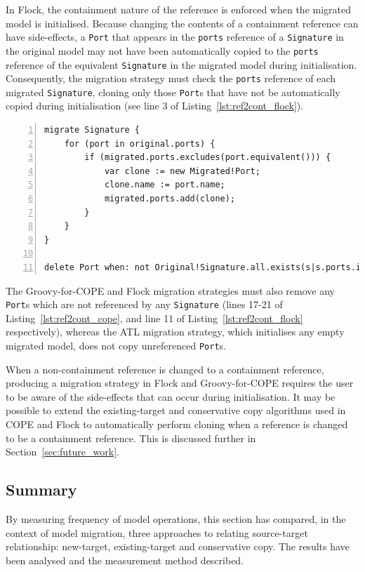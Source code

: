 In Flock, the containment nature of the reference is enforced when the migrated model is initialised. Because changing the contents of a containment reference can have side-effects, a \texttt{Port} that appears in the \texttt{ports} reference of a \texttt{Signature} in the original model may not have been automatically copied to the \texttt{ports} reference of the equivalent \texttt{Signature} in the migrated model during initialisation. Consequently, the migration strategy must check the \texttt{ports} reference of each migrated \texttt{Signature}, cloning only those \texttt{Port}s that have not be automatically copied during initialisation (see line 3 of Listing~\ref{lst:ref2cont_flock}).

\begin{lstlisting}[basicstyle=\ttfamily\footnotesize, flexiblecolumns=true, numbers=left, nolol=true, caption=Change R to C model migration in Flock, label=lst:ref2cont_flock, language=Flock, tabsize=2]
migrate Signature {
	for (port in original.ports) {
		if (migrated.ports.excludes(port.equivalent())) {
			var clone := new Migrated!Port;
			clone.name := port.name;
			migrated.ports.add(clone);
		}
	}
}

delete Port when: not Original!Signature.all.exists(s|s.ports.includes(original))
\end{lstlisting}

The Groovy-for-COPE and Flock migration strategies must also remove any \texttt{Port}s which are not referenced by any \texttt{Signature} (lines 17-21 of Listing~\ref{lst:ref2cont_cope}, and line 11 of Listing~\ref{lst:ref2cont_flock} respectively), whereas the ATL migration strategy, which initialises any empty migrated model, does not copy unreferenced \texttt{Port}s.

When a non-containment reference is changed to a containment reference, producing a migration strategy in Flock and Groovy-for-COPE requires the user to be aware of the side-effects that can occur during initialisation. It may be possible to extend the existing-target and conservative copy algorithms used in COPE and Flock to automatically perform cloning when a reference is changed to be a containment reference. This is discussed further in Section~\ref{sec:future_work}.


\subsection{Summary}
By measuring frequency of model operations, this section has compared, in the context of model migration, three approaches to relating source-target relationship: new-target, existing-target and conservative copy. The results have been analysed and the measurement method described.

